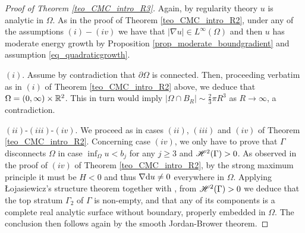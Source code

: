 \documentclass[10 pt,a4paper]{article}
\theoremstyle{definition}
\begin{document}
\begin{proof}[Proof of Theorem \ref{teo_CMC_intro_R3}]
	Again, by regularity theory $u$ is analytic in $\Omega$. As in the proof of Theorem \ref{teo_CMC_intro_R2}, under any of the assumptions $(i)-(iv)$ we have that $|\nabla u| \in L^\infty(\Omega)$ and then $u$ has moderate energy growth by Proposition \ref{prop_moderate_boundgradient} and assumption \eqref{eq_quadraticgrowth}.
	
	$(i)$. Assume by contradiction that $\partial \Omega$ is connected. Then, proceeding verbatim as in $(i)$ of Theorem \ref{teo_CMC_intro_R2} above, we deduce that $\Omega = (0,\infty) \times \mathbb R^2$. This in turn would imply $|\Omega\cap B_R|\sim\frac23\pi R^3$ as $R\to \infty$, a contradiction.	
%	
%	
	
	$(ii)$-$(iii)$-$(iv)$. We proceed as in cases $(ii)$, $(iii)$ and $(iv)$ of Theorem \ref{teo_CMC_intro_R2}.	
	Concerning case $(iv)$, we only have to prove that $\Gamma$ disconnects $\Omega$ in case $\inf_\Omega u < b_j$ for any $j\geq 3$ and $\mathscr{H}^2(\Gamma) > 0$. As observed in the proof of $(iv)$ of Theorem \ref{teo_CMC_intro_R2}, by the strong maximum principle it must be $H < 0$ and thus $\nabla \mathrm{d} u \neq0$ everywhere in $\Omega$. Applying \L ojasiewicz's structure theorem together with \cite[Corollary 3.4]{BCM}, from $\mathscr{H}^{2}(\Gamma)>0$ we deduce that the top stratum $\Gamma_2$ of $\Gamma$ is non-empty, and that any of its components is a complete real analytic surface without boundary, properly embedded in $\Omega$. The conclusion then follows again by the smooth Jordan-Brower theorem.
\end{proof}
\end{document}
